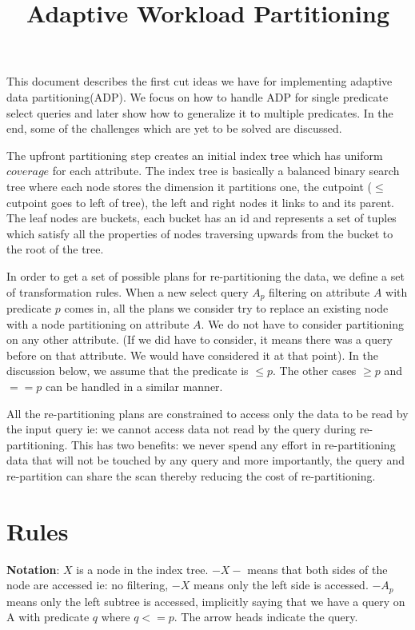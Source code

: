 \documentclass[18pt]{article}
\begin{document}
\title{Adaptive Workload Partitioning}
\maketitle

This document describes the first cut ideas we have for implementing adaptive data  partitioning(ADP). We focus on how to handle ADP for single predicate select queries and later show how to generalize it to multiple predicates. In the end, some of the challenges which are yet to be solved are discussed.

The upfront partitioning step creates an initial index tree which has uniform $coverage$ for each attribute. The index tree is basically a balanced binary search tree where each node stores the dimension it partitions one, the cutpoint ($\leq$ cutpoint goes to left of tree), the left and right nodes it links to and its parent. The leaf nodes are buckets, each bucket has an id and represents a set of tuples which satisfy all the properties of nodes traversing upwards from the bucket to the root of the tree. 

In order to get a set of possible plans for re-partitioning the data, we define a set of transformation rules. When a new select query $A_p$ filtering on attribute $A$ with predicate $p$ comes in, all the plans we consider try to replace an existing node with a node partitioning on attribute $A$. We do not have to consider partitioning on any other attribute. (If we did have to consider, it means there was a query before on that attribute. We would have considered it at that point). In the discussion below, we assume that the predicate is $\leq p$. The other cases $\geq p$ and $== p$ can be handled in a similar manner.

All the re-partitioning plans are constrained to access only the data to be read by the input query ie: we cannot access data not read by the query during re-partitioning. This has two benefits: we never spend any effort in re-partitioning data that will not be touched by any query and more importantly, the query and re-partition can share the scan thereby reducing the cost of re-partitioning.

\section{Rules}

\textbf{Notation}: $X$ is a node in the index tree. $- X -$ means that both sides of the node are accessed ie: no filtering, $- X$ means only the left side is accessed. $- {A_p}$ means only the left subtree is accessed, implicitly saying that we have a query on A with predicate $q$ where $q <= p$. The arrow heads indicate the query.
\end{document}
